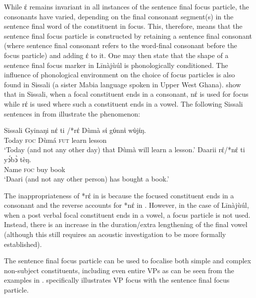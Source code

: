 \documentclass[output=paper,colorlinks,citecolor=brown]{langscibook}
\begin{document}
While έ remains invariant in all instances of the sentence final focus particle, the consonants have varied, depending on the final consonant segment(s) in the sentence final word of the constituent in focus. This, therefore, means that the sentence final focus particle is constructed by retaining a sentence final consonant (where sentence final consonant refers to the word-final consonant before the focus particle) and adding έ to it. One may then state that the shape of a sentence final focus marker in Līnàjùúl is phonologically conditioned. The influence of phonological environment on the choice of focus particles is also found in Sissali (a sister Mabia language spoken in Upper West Ghana). \citet{Dumah2017} show that in Sissali, when a focal constituent ends in a consonant, nέ is used for focus while rέ is used where such a constituent ends in a vowel. The following Sissali sentences in  from \citet{Dumah2017} illustrate the phenomenon:

\ea%
    \label{ex:bisilki:18}
    Sissali \citep[84]{Dumah2017}
    \ea\label{ex:bisilki:18a}
    \gll    Gyinaŋi	nέ ti /*rέ	Dùmà		sί	gύnnὶ wὺjίŋ.\\
            Today		\textsc{foc} {} {}		Dùmá 		\textsc{fut} 	 learn 	        lesson\\
    \glt    ‘Today (and not any other day) that Dùmà will learn a lesson.’
    \ex\label{ex:bisilki:18b}
    \gll    Daarii		rέ/*nέ ti	yↄ́bↄ̀	 tèŋ.\\
            Name		\textsc{foc} {}		buy	book\\
    \glt    ‘Daari (and not any other person) has bought a book.’
    \z
\z


The inappropriateness of *rέ in  is because the focused constituent ends in a consonant and the reverse accounts for *nέ in . However, in the case of Līnàjùúl, when a post verbal focal constituent ends in a vowel, a focus particle is not used. Instead, there is an increase in the duration/extra lengthening of the final vowel (although this still requires an acoustic investigation to be more formally established).

The sentence final focus particle can be used to focalise both simple and complex non-subject constituents, including even entire VPs as can be seen from the examples in .  specifically illustrates VP focus with the sentence final focus particle.
\end{document}
